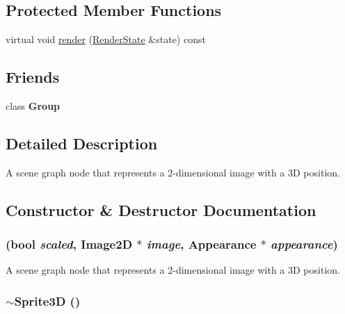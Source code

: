 \subsection*{Protected Member Functions}
\begin{CompactItemize}
\item 
virtual void \hyperlink{classm3g_1_1Sprite3D_8babc8a79b78615da51161e94029eea9}{render} (\hyperlink{structm3g_1_1RenderState}{RenderState} \&state) const 
\end{CompactItemize}
\subsection*{Friends}
\begin{CompactItemize}
\item 
\hypertarget{classm3g_1_1Sprite3D_2697825715974a353728f0d4d5658112}{
class \textbf{Group}}
\label{classm3g_1_1Sprite3D_2697825715974a353728f0d4d5658112}

\end{CompactItemize}


\subsection{Detailed Description}
A scene graph node that represents a 2-dimensional image with a 3D position. 

\subsection{Constructor \& Destructor Documentation}
\hypertarget{classm3g_1_1Sprite3D_9cb33fd453d441ed8e99b95f5e29df0c}{
\subsubsection[{Sprite3D}]{ (bool {\em scaled}, \/  {\bf Image2D} $\ast$ {\em image}, \/  {\bf Appearance} $\ast$ {\em appearance})}}
\label{classm3g_1_1Sprite3D_9cb33fd453d441ed8e99b95f5e29df0c}


A scene graph node that represents a 2-dimensional image with a 3D position. \hypertarget{classm3g_1_1Sprite3D_a57bd1e3141ba11c88ddec1e46c188d6}{
\subsubsection[{$\sim$Sprite3D}]{\setlength{\rightskip}{0pt plus 5cm}$\sim${\bf Sprite3D} ()}}
\label{classm3g_1_1Sprite3D_a57bd1e3141ba11c88ddec1e46c188d6}


